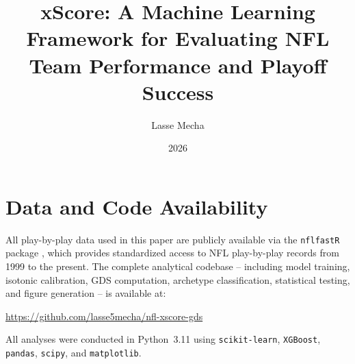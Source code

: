 \documentclass[12pt,a4paper]{report}
\title{xScore: A Machine Learning Framework for Evaluating NFL Team Performance and Playoff Success}
\author{Lasse Mecha}
\date{2026}
\begin{document}
\maketitle




\tableofcontents
\listoffigures
\listoftables
\newpage













\chapter*{Data and Code Availability}

All play-by-play data used in this paper are publicly available via the
\texttt{nflfastR} package \parencite{carl2021nflfastr}, which provides
standardized access to NFL play-by-play records from 1999 to the present.
The complete analytical codebase -- including model training, isotonic
calibration, GDS computation, archetype classification, statistical testing,
and figure generation -- is available at:

\begin{center}
\url{https://github.com/lasse5mecha/nfl-xscore-gds}
\end{center}

\noindent All analyses were conducted in Python~3.11 using \texttt{scikit-learn},
\texttt{XGBoost}, \texttt{pandas}, \texttt{scipy}, and \texttt{matplotlib}.

\printbibliography[heading=bibintoc]
\end{document}
